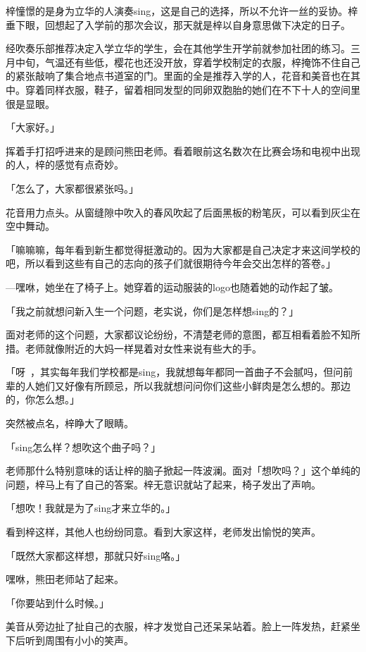 \documentclass[UTF8]{ctexart}
\begin{document}
    梓憧憬的是身为立华的人演奏sing，这是自己的选择，所以不允许一丝的妥协。梓垂下眼，回想起了入学前的那次会议，那天就是梓以自身意思做下决定的日子。

    经吹奏乐部推荐决定入学立华的学生，会在其他学生开学前就参加社团的练习。三月中旬，气温还有些低，樱花也还没开放，穿着学校制定的衣服，梓掩饰不住自己的紧张敲响了集合地点书道室的门。里面的全是推荐入学的人，花音和美音也在其中。穿着同样衣服，鞋子，留着相同发型的同卵双胞胎的她们在不下十人的空间里很是显眼。

    「大家好。」

    挥着手打招呼进来的是顾问熊田老师。看着眼前这名数次在比赛会场和电视中出现的人，梓的感觉有点奇妙。

    「怎么了，大家都很紧张吗。」

    花音用力点头。从窗缝隙中吹入的春风吹起了后面黑板的粉笔灰，可以看到灰尘在空中舞动。

    「嘛嘛嘛，每年看到新生都觉得挺激动的。因为大家都是自己决定才来这间学校的吧，所以看到这些有自己的志向的孩子们就很期待今年会交出怎样的答卷。」

    —嘿咻，她坐在了椅子上。她穿着的运动服装的logo也随着她的动作起了皱。

    「我之前就想问新入生一个问题，老实说，你们是怎样想sing的？」

    面对老师的这个问题，大家都议论纷纷，不清楚老师的意图，都互相看着脸不知所措。老师就像附近的大妈一样晃着对女性来说有些大的手。

    「呀~，其实每年我们学校都是sing，我就想每年都同一首曲子不会腻吗，但问前辈的人她们又好像有所顾忌，所以我就想问问你们这些小鲜肉是怎么想的。那边的，你怎么想。」

    突然被点名，梓睁大了眼睛。

    「sing怎么样？想吹这个曲子吗？」

    老师那什么特别意味的话让梓的脑子掀起一阵波澜。面对「想吹吗？」这个单纯的问题，梓马上有了自己的答案。梓无意识就站了起来，椅子发出了声响。

    「想吹！我就是为了sing才来立华的。」

    看到梓这样，其他人也纷纷同意。看到大家这样，老师发出愉悦的笑声。

    「既然大家都这样想，那就只好sing咯。」

    嘿咻，熊田老师站了起来。

    「你要站到什么时候。」

    美音从旁边扯了扯自己的衣服，梓才发觉自己还呆呆站着。脸上一阵发热，赶紧坐下后听到周围有小小的笑声。
\end{document}
